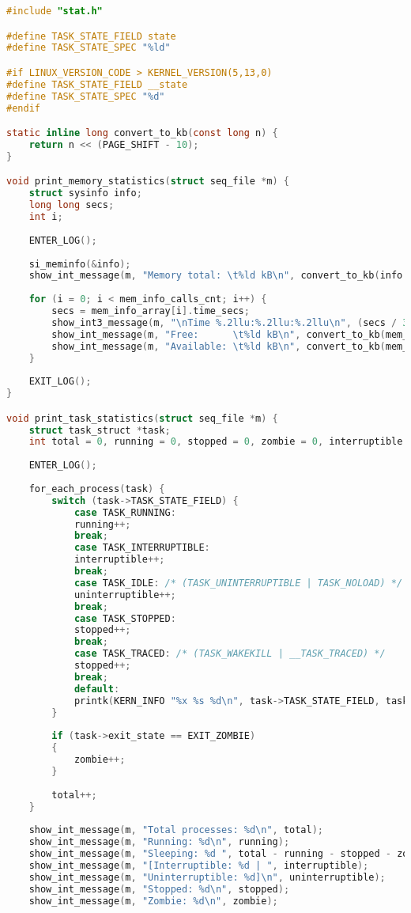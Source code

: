 \begin{lstlisting}[label=lst:stat, caption=Листинг файла stat.c, language=c]
#include "stat.h"

#define TASK_STATE_FIELD state
#define TASK_STATE_SPEC "%ld"

#if LINUX_VERSION_CODE > KERNEL_VERSION(5,13,0)
#define TASK_STATE_FIELD __state
#define TASK_STATE_SPEC "%d"
#endif

static inline long convert_to_kb(const long n) {
	return n << (PAGE_SHIFT - 10);
}

void print_memory_statistics(struct seq_file *m) {
	struct sysinfo info;
	long long secs;
	int i;
	
	ENTER_LOG();
	
	si_meminfo(&info);
	show_int_message(m, "Memory total: \t%ld kB\n", convert_to_kb(info.totalram));
	
	for (i = 0; i < mem_info_calls_cnt; i++) {
		secs = mem_info_array[i].time_secs;
		show_int3_message(m, "\nTime %.2llu:%.2llu:%.2llu\n", (secs / 3600 + 3) % 24, secs / 60 % 60, secs % 60);
		show_int_message(m, "Free:      \t%ld kB\n", convert_to_kb(mem_info_array[i].free));
		show_int_message(m, "Available: \t%ld kB\n", convert_to_kb(mem_info_array[i].available));
	}
	
	EXIT_LOG();
}

void print_task_statistics(struct seq_file *m) {
	struct task_struct *task;
	int total = 0, running = 0, stopped = 0, zombie = 0, interruptible = 0, uninterruptible;
	
	ENTER_LOG();
	
	for_each_process(task) {
		switch (task->TASK_STATE_FIELD) {
			case TASK_RUNNING:
			running++;
			break;
			case TASK_INTERRUPTIBLE:
			interruptible++;
			break;
			case TASK_IDLE: /* (TASK_UNINTERRUPTIBLE | TASK_NOLOAD) */
			uninterruptible++;
			break;
			case TASK_STOPPED:
			stopped++;
			break;
			case TASK_TRACED: /* (TASK_WAKEKILL | __TASK_TRACED) */
			stopped++;
			break;
			default:
			printk(KERN_INFO "%x %s %d\n", task->TASK_STATE_FIELD, task->comm, task->pid);
		}
		
		if (task->exit_state == EXIT_ZOMBIE)
		{
			zombie++;
		}
		
		total++;
	}
	
	show_int_message(m, "Total processes: %d\n", total);
	show_int_message(m, "Running: %d\n", running);
	show_int_message(m, "Sleeping: %d ", total - running - stopped - zombie);
	show_int_message(m, "[Interruptible: %d | ", interruptible);
	show_int_message(m, "Uninterruptible: %d]\n", uninterruptible);
	show_int_message(m, "Stopped: %d\n", stopped);
	show_int_message(m, "Zombie: %d\n", zombie);
	

\end{lstlisting}
